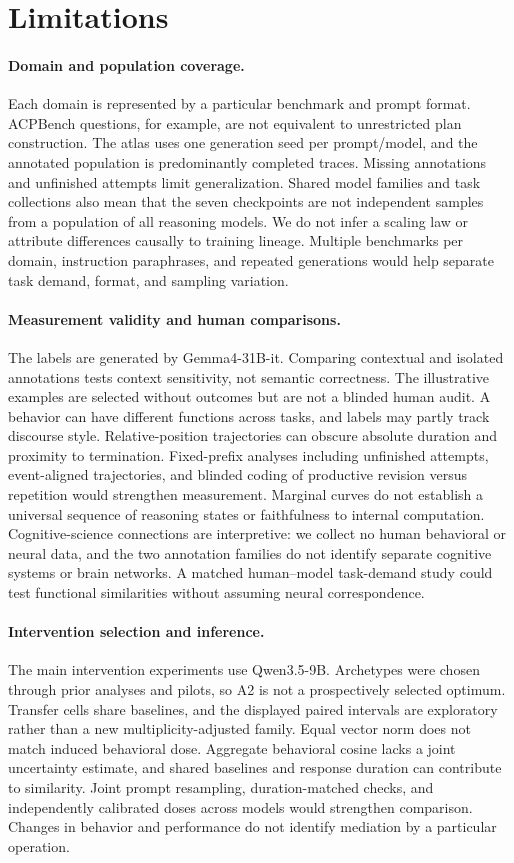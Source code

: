 \section*{Limitations}
\paragraph{Domain and population coverage.}
Each domain is represented by a particular benchmark and prompt format. ACPBench questions, for example, are not equivalent to unrestricted plan construction. The atlas uses one generation seed per prompt/model, and the annotated population is predominantly completed traces. Missing annotations and unfinished attempts limit generalization. Shared model families and task collections also mean that the seven checkpoints are not independent samples from a population of all reasoning models. We do not infer a scaling law or attribute differences causally to training lineage. Multiple benchmarks per domain, instruction paraphrases, and repeated generations would help separate task demand, format, and sampling variation.

\paragraph{Measurement validity and human comparisons.}
The labels are generated by Gemma4-31B-it. Comparing contextual and isolated annotations tests context sensitivity, not semantic correctness. The illustrative examples are selected without outcomes but are not a blinded human audit. A behavior can have different functions across tasks, and labels may partly track discourse style. Relative-position trajectories can obscure absolute duration and proximity to termination. Fixed-prefix analyses including unfinished attempts, event-aligned trajectories, and blinded coding of productive revision versus repetition would strengthen measurement. Marginal curves do not establish a universal sequence of reasoning states or faithfulness to internal computation. Cognitive-science connections are interpretive: we collect no human behavioral or neural data, and the two annotation families do not identify separate cognitive systems or brain networks. A matched human--model task-demand study could test functional similarities without assuming neural correspondence.

\paragraph{Intervention selection and inference.}
The main intervention experiments use Qwen3.5-9B. Archetypes were chosen through prior analyses and pilots, so A2 is not a prospectively selected optimum. Transfer cells share baselines, and the displayed paired intervals are exploratory rather than a new multiplicity-adjusted family. Equal vector norm does not match induced behavioral dose. Aggregate behavioral cosine lacks a joint uncertainty estimate, and shared baselines and response duration can contribute to similarity. Joint prompt resampling, duration-matched checks, and independently calibrated doses across models would strengthen comparison. Changes in behavior and performance do not identify mediation by a particular operation.

